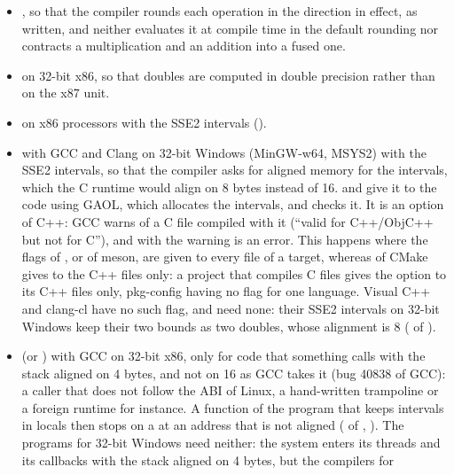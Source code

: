 \begin{itemize}
\item {}, so that the
  compiler rounds each operation in the direction in effect, as written, and
  neither evaluates it at compile time in the default rounding nor contracts a
  multiplication and an addition into a fused one.
\item {} on 32-bit x86, so that doubles are computed
  in double precision rather than on the x87 unit.
\item {} on x86 processors with the SSE2 intervals
  ().
\item {} with GCC and Clang on 32-bit Windows
  (MinGW-w64, MSYS2) with the SSE2 intervals, so that the compiler asks for
  aligned memory for the intervals, which the C runtime would align on 8 bytes
  instead of 16.\newinvfive{}  and  give it to
  the code using GAOL, which allocates the intervals, and
   checks it. It is an option of C++: GCC warns of a
  C file compiled with it (``valid for C++/ObjC++ but not for C''), and with
   the warning is an error. This happens where the flags of
  , or  of meson, are given to every file of a
  target, whereas  of CMake gives  to the C++
  files only: a project that compiles C files gives the option to its C++ files
  only, pkg-config having no flag for one language. Visual C++ and clang-cl have no such flag, and need none: their
  SSE2 intervals on 32-bit Windows keep their two bounds as two doubles, whose
  alignment is 8 ( of
  ).
\item {} (or ) with
  GCC on 32-bit x86, only for code that something calls with the stack aligned
  on 4 bytes, and not on 16 as GCC takes it (bug 40838 of GCC): a caller that
  does not follow the ABI of Linux, a hand-written trampoline or a foreign
  runtime for instance. A function of the program that keeps intervals in
  locals then stops on a  at an address that is not aligned
  ( of
  , ).\newinvfive{} The
  programs for 32-bit Windows need neither: the system enters its threads and
  its callbacks with the stack aligned on 4 bytes, but the compilers for

\end{itemize}
